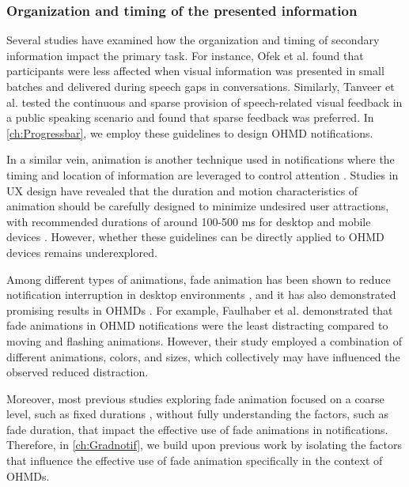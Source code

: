 \subsubsection*{Organization and timing of the presented information} 
\label{sec:Relatedwork:ohmd_notification:timing}

Several studies have examined how the organization and timing of secondary information impact the primary task. For instance, Ofek et al. \cite{ofek_reducing_2013} found that participants were less affected when visual information was presented in small batches and delivered during speech gaps in conversations. Similarly, Tanveer et al. \cite{tanveer_rhema_2015} tested the continuous and sparse provision of speech-related visual feedback in a public speaking scenario and found that sparse feedback was preferred. In \autoref{ch:Progressbar}, we employ these guidelines to design OHMD notifications.

In a similar vein, animation is another technique used in notifications where the timing and location of information are leveraged to control attention \cite{tasse_getting_2016, maglio_tradeoffs_2000, mccrickard_evaluating_2001}. Studies in UX design have revealed that the duration and motion characteristics of animation should be carefully designed to minimize undesired user attractions, with recommended durations of around 100-500 ms for desktop and mobile devices \cite{page_executing_2023, head_designing_2016}. However, whether these guidelines can be directly applied to OHMD devices remains underexplored.

Among different types of animations, fade animation has been shown to reduce notification interruption in desktop environments \cite{mccrickard_establishing_2003, mccrickard_evaluating_2001, maglio_tradeoffs_2000, wilson_gradual_2006}, and it has also demonstrated promising results in OHMDs \cite{faulhaber_priority_dependent_2022}. For example, Faulhaber et al. \cite{faulhaber_priority_dependent_2022} demonstrated that fade animations in OHMD notifications were the least distracting compared to moving and flashing animations. However, their study employed a combination of different animations, colors, and sizes, which collectively may have influenced the observed reduced distraction.

Moreover, most previous studies exploring fade animation focused on a coarse level, such as fixed durations \cite{faulhaber_priority_dependent_2022, tasse_getting_2016, maglio_tradeoffs_2000, mccrickard_evaluating_2001, mccrickard_establishing_2003, luyten_hidden_2016}, without fully understanding the factors, such as fade duration, that impact the effective use of fade animations in notifications.
Therefore, in \autoref{ch:Gradnotif}, we build upon previous work by isolating the factors that influence the effective use of fade animation specifically in the context of OHMDs.


